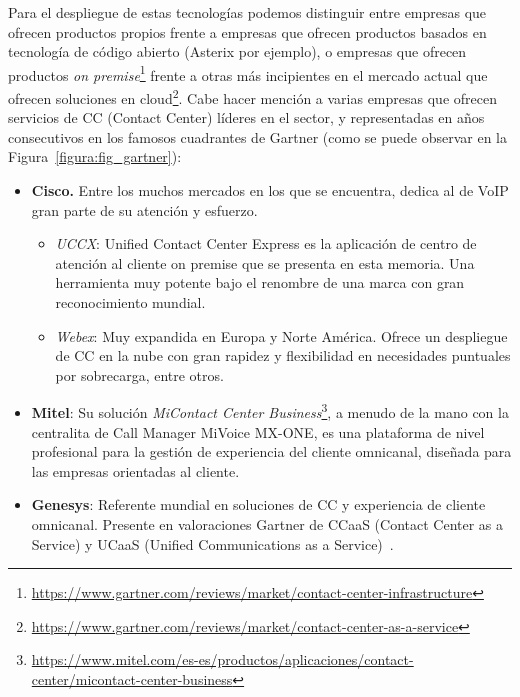 \documentclass[a4paper, 12pt]{book}
\begin{document}
Para el despliegue de estas tecnologías podemos distinguir entre empresas que ofrecen productos propios frente a empresas que ofrecen productos basados en tecnología de código abierto (Asterix por ejemplo), o empresas que ofrecen productos \emph{on premise}\footnote{\url{https://www.gartner.com/reviews/market/contact-center-infrastructure}} frente a otras más incipientes en el mercado actual que ofrecen soluciones en cloud\footnote{\url{https://www.gartner.com/reviews/market/contact-center-as-a-service}}. Cabe hacer mención a varias empresas que ofrecen servicios de CC (Contact Center)  líderes en el sector, y representadas en años consecutivos en los famosos cuadrantes de Gartner (como se puede observar en la Figura~\ref{figura:fig_gartner}):
\begin{itemize}
  \item \textbf{Cisco.} Entre los muchos mercados en los que se encuentra, dedica al de VoIP gran parte de su atención y esfuerzo.   

  \begin{itemize}
    \item \emph{UCCX}: Unified Contact Center Express es la aplicación de centro de atención al cliente on premise que se presenta en esta memoria. Una herramienta muy potente bajo el renombre de una marca con gran reconocimiento mundial.
    \item \emph{Webex}: Muy expandida en Europa y Norte América. Ofrece un despliegue de CC en la nube con gran rapidez y flexibilidad en necesidades puntuales por sobrecarga, entre otros.
  \end{itemize}  

  \item \textbf{Mitel}: Su solución \emph{MiContact Center Business}\footnote{\url{https://www.mitel.com/es-es/productos/aplicaciones/contact-center/micontact-center-business}}, a menudo de la mano con la centralita de Call Manager MiVoice MX-ONE, es una plataforma de nivel profesional para la gestión de experiencia del cliente omnicanal, diseñada para las empresas orientadas al cliente.

  \item \textbf{Genesys}: Referente mundial en soluciones de CC y experiencia de cliente omnicanal. Presente en valoraciones Gartner de CCaaS (Contact Center as a Service) y UCaaS (Unified Communications as a Service)~\cite{gartner:_magic_quadrant}.
\end{itemize}
\end{document}
